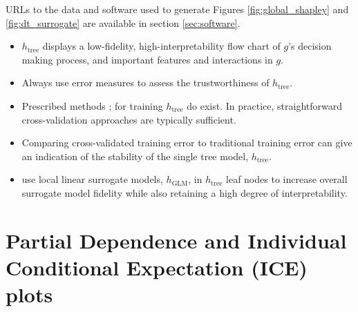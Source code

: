 \documentclass{article}
\begin{document}
URLs to the data and software used to generate Figures \ref{fig:global_shapley} and \ref{fig:dt_surrogate} are available in section \ref{sec:software}.







\begin{itemize}
	

	
	\item $h_{\text{tree}}$ displays a low-fidelity, high-interpretability flow chart of $g$'s decision making process, and important features and interactions in $g$.	
	
\end{itemize}

\begin{itemize}
	
	\item Always use error measures to assess the trustworthiness of $h_{\text{tree}}$.
	
	\item Prescribed methods \cite{dt_surrogate1}; \cite{dt_surrogate2} for training $h_{\text{tree}}$ do exist. In practice, straightforward cross-validation approaches are typically sufficient. 
	
	\item Comparing cross-validated training error to traditional training error can give an indication of the stability of the single tree model, $h_{\text{tree}}$.
	
	\item \cite{lime-sup} use local linear surrogate models, $h_{\text{GLM}}$, in $h_{\text{tree}}$ leaf nodes to increase overall surrogate model fidelity while also retaining a high degree of interpretability.
	
\end{itemize}

\section{Partial Dependence and Individual Conditional Expectation (ICE) plots}
\label{sec:pd_ice}
\end{document}

